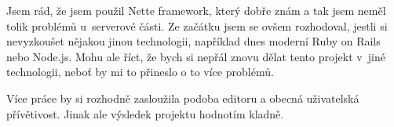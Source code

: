 \documentclass[11pt,twoside,a4paper]{book}
\begin{document}
Jsem rád, že jsem použil Nette framework, který dobře znám a tak jsem neměl tolik problémů u~serverové části. Ze začátku jsem se ovšem rozhodoval, jestli si nevyzkoušet nějakou jinou technologii, například dnes moderní Ruby on Rails nebo Node.js. Mohu ale říct, že bych si nepřál znovu dělat tento projekt v~jiné technologii, neboť by mi to přineslo o to více problémů.

Více práce by si rozhodně zasloužila podoba editoru a obecná uživatelská přívětivost. Jinak ale výsledek projektu hodnotím kladně.

{}

\end{document}
